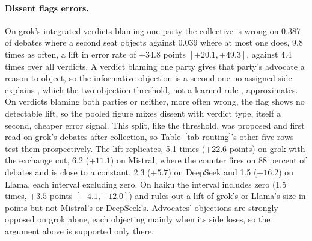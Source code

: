 \paragraph{Dissent flags errors.}
On grok's integrated verdicts blaming one party the collective is wrong on 0.387 of
debates where a second seat objects against 0.039 where at most one does,
9.8 times as often, a lift in error rate of $+34.8$ points $[+20.1, +49.3]$,
against 4.4 times over all verdicts.
A verdict blaming one party gives that party's advocate a reason to
object, so the informative objection is a second one no assigned side
explains \citep{milgrom1986relying,lipman1995robust}, which the
two-objection threshold, not a learned rule \citep{he2026minoritysentinel},
approximates.
On verdicts blaming both parties or neither, more often wrong, the flag shows no
detectable lift,
 so the pooled figure mixes dissent with verdict
type, itself a second, cheaper error signal. This split, like the
threshold, was proposed and first read on grok's debates after
collection, so Table~\ref{tab-routing}'s other five rows test them
prospectively.
The lift replicates, 5.1 times ($+22.6$ points) on grok with the exchange
cut, 6.2 ($+11.1$) on Mistral,
 where the counter fires on 88 percent of
debates and is close to a constant, 2.3 ($+5.7$) on DeepSeek and 1.5
($+16.2$) on Llama, each interval excluding zero. On haiku the interval
includes zero (1.5 times, $+3.5$ points $[-4.1, +12.0]$) and rules out a
lift of grok's or Llama's size in points but not Mistral's or DeepSeek's.
Advocates' objections are strongly opposed on grok alone, each objecting
mainly when its side loses, so the argument above is supported only there.

\begin{table}[t]
\centering
\small
\caption{\textbf{Routing improves the collective on every row but beats the solo
only on Mistral.} Solo (S, the model's majority of three brief unscaffolded
answers), collective (C, the integrated verdict) and routed (R, after routing
to sonnet) are accuracies on the crowd verdict. $n$ counts codable debates,
whose synthesis and integrated verdict each blame one party, both or
neither, fire is the share flagged, differences are paired per debate, in
points, $^{\circ}$ marking a 95 percent interval including zero
(Table~\ref{tab-app-routing-ci}), and precision and recall are the shares of
flagged one-party verdicts that are wrong and of wrong ones flagged. Exchange
cut, where no seat reads another's statements, has no solo pairing (dashes).}
\label{tab-routing}

\end{table}

